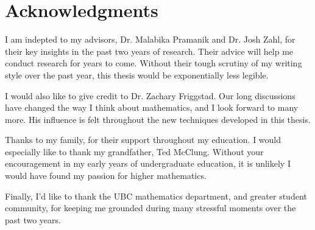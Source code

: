 
\chapter{Acknowledgments}

I am indepted to my advisors, Dr. Malabika Pramanik and Dr. Josh Zahl, for their key insights in the past two years of research. Their advice will help me conduct research for years to come. Without their tough scrutiny of my writing style over the past year, this thesis would be exponentially less legible.

I would also like to give credit to Dr. Zachary Friggstad. Our long discussions have changed the way I think about mathematics, and I look forward to many more. His influence is felt throughout the new techniques developed in this thesis.

Thanks to my family, for their support throughout my education. I would especially like to thank my grandfather, Ted McClung. Without your encouragement in my early years of undergraduate education, it is unlikely I would have found my passion for higher mathematics.

Finally, I'd like to thank the UBC mathematics department, and greater student community, for keeping me grounded during many stressful moments over the past two years.

